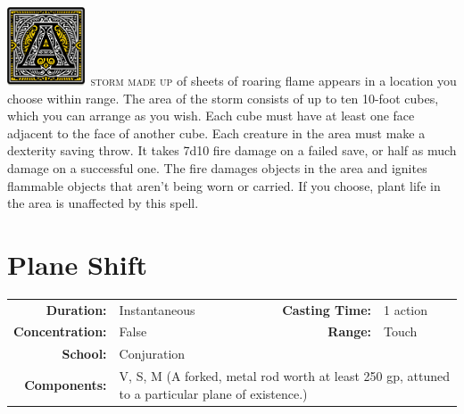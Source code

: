 \documentclass[12pt,showtrims]{memoir}
\begin{document}
\vspace{1\baselineskip}\noindent
\lettrine[lines=4]{\includegraphics[height=66pt]{initials/A.png}}{\ storm made up} of sheets of roaring flame appears in a location you choose within range. The area of the storm consists of up to ten 10-foot cubes, which you can arrange as you wish. Each cube must have at least one face adjacent to the face of another cube. Each creature in the area must make a dexterity saving throw. It takes 7d10 fire damage on a failed save, or half as much damage on a successful one. The fire damages objects in the area and ignites flammable objects that aren't being worn or carried. If you choose, plant life in the area is unaffected by this spell.

\newpage
\section*{Plane Shift}

{
\small\centering\vspace{-6pt}
\begin{tabular}{rlrl}
\toprule

\textbf{Duration:} & Instantaneous &
\textbf{Casting Time:} & 1 action \\
\textbf{Concentration:} & False &
\textbf{Range:} & Touch \\
\textbf{School:} & Conjuration \\
\textbf{Components:} & \multicolumn{3}{p{0.7\textwidth}}{V, S, M (A forked, metal rod worth at least 250 gp, attuned to a particular plane of existence.)}\\

\bottomrule
\end{tabular}
}
\end{document}
